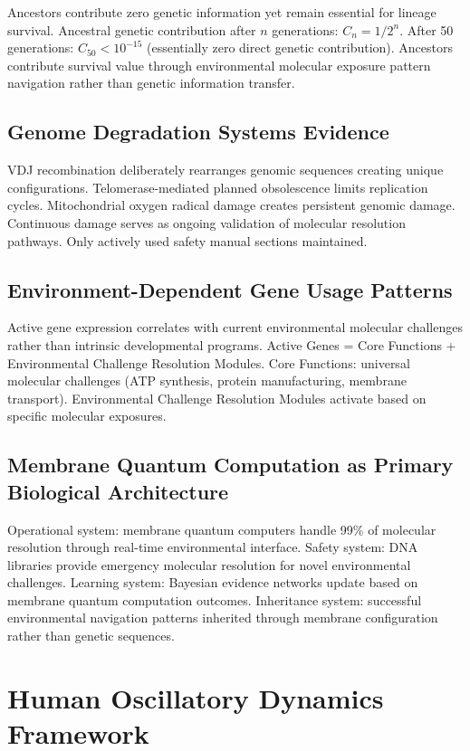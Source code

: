 \documentclass[12pt,a4paper]{article}
\begin{document}
Ancestors contribute zero genetic information yet remain essential for lineage survival. Ancestral genetic contribution after $n$ generations: $C_n = 1/2^n$. After 50 generations: $C_{50} < 10^{-15}$ (essentially zero direct genetic contribution). Ancestors contribute survival value through environmental molecular exposure pattern navigation rather than genetic information transfer.

\subsection{Genome Degradation Systems Evidence}

VDJ recombination deliberately rearranges genomic sequences creating unique configurations. Telomerase-mediated planned obsolescence limits replication cycles. Mitochondrial oxygen radical damage creates persistent genomic damage. Continuous damage serves as ongoing validation of molecular resolution pathways. Only actively used safety manual sections maintained.

\subsection{Environment-Dependent Gene Usage Patterns}

Active gene expression correlates with current environmental molecular challenges rather than intrinsic developmental programs. Active Genes = Core Functions + Environmental Challenge Resolution Modules. Core Functions: universal molecular challenges (ATP synthesis, protein manufacturing, membrane transport). Environmental Challenge Resolution Modules activate based on specific molecular exposures.

\subsection{Membrane Quantum Computation as Primary Biological Architecture}

Operational system: membrane quantum computers handle 99\% of molecular resolution through real-time environmental interface. Safety system: DNA libraries provide emergency molecular resolution for novel environmental challenges. Learning system: Bayesian evidence networks update based on membrane quantum computation outcomes. Inheritance system: successful environmental navigation patterns inherited through membrane configuration rather than genetic sequences.

\section{Human Oscillatory Dynamics Framework}
\end{document}
